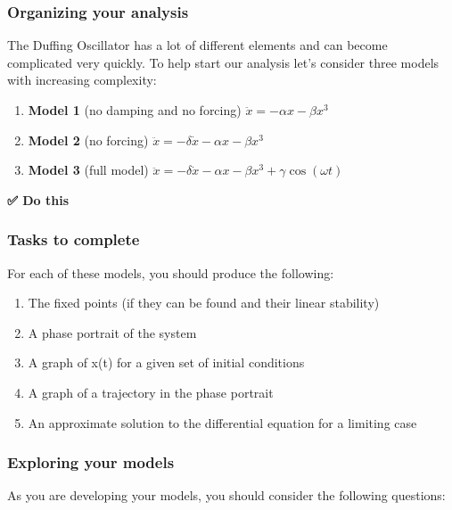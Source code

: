 \subsubsection{Organizing your analysis}\label{organizing-your-analysis}

The Duffing Oscillator has a lot of different elements and can become
complicated very quickly. To help start our analysis let's consider
three models with increasing complexity:

\begin{enumerate}
\def\labelenumi{\arabic{enumi}.}
\tightlist
\item
  \textbf{Model 1} (no damping and no forcing)
  \(\ddot{x} = - \alpha x - \beta x^3\)
\item
  \textbf{Model 2} (no forcing)
  \(\ddot{x} = - \delta \dot{x} - \alpha x - \beta x^3\)
\item
  \textbf{Model 3} (full model)
  \(\ddot{x} = - \delta \dot{x} - \alpha x - \beta x^3 + \gamma \cos(\omega t)\)
\end{enumerate}

\textbf{✅ Do this}

\subsubsection{Tasks to complete}\label{tasks-to-complete}

For each of these models, you should produce the following:

\begin{enumerate}
\def\labelenumi{\arabic{enumi}.}
\tightlist
\item
  The fixed points (if they can be found and their linear stability)
\item
  A phase portrait of the system
\item
  A graph of x(t) for a given set of initial conditions
\item
  A graph of a trajectory in the phase portrait
\item
  An approximate solution to the differential equation for a limiting
  case
\end{enumerate}

\subsubsection{Exploring your models}\label{exploring-your-models}

As you are developing your models, you should consider the following
questions:


